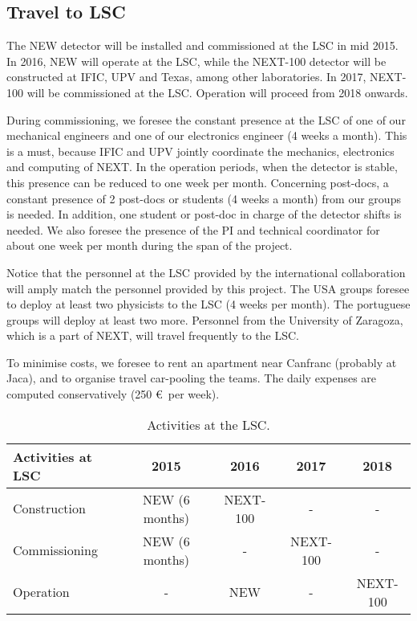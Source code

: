 \subsection{Travel to LSC}
The NEW detector will be installed and commissioned at the LSC in mid 2015. In 2016, NEW will operate at the LSC, while the NEXT-100 detector will be constructed at IFIC, UPV and Texas, among other laboratories. In 2017, NEXT-100 will be commissioned at the LSC. Operation will proceed from 2018 onwards.

During commissioning, we foresee the constant presence at the LSC of one of our mechanical engineers and one of our electronics engineer (4 weeks a month).  This is a must, because IFIC and UPV jointly coordinate the mechanics, electronics and computing of NEXT. In the operation periods, when the detector is stable, this presence can be reduced to one week per month. Concerning post-docs, a constant presence of 2 post-docs or students (4 weeks a month) from our groups is needed. In addition, one student or post-doc in charge of the detector shifts is needed. We also foresee the presence of the PI and technical coordinator for about one week per month during the span of the project. 

Notice that the personnel at the LSC provided by the international collaboration will amply match the personnel provided by this project. The USA groups foresee to deploy at least two physicists to the LSC (4 weeks per month). The portuguese groups will deploy at least two more. Personnel from the University of Zaragoza, which is a part of NEXT, will travel frequently to the LSC. 

To minimise costs, we foresee to rent an apartment near Canfranc (probably at Jaca), and to organise travel car-pooling the teams. The daily expenses are computed conservatively (250 \euro\ per week). 

\begin{table}[h!]
\begin{center}
\begin{tabular}{|l|c|c|c|c|}
\hline
Activities at LSC &	2015 &	2016 &	2017 &	2018\\
 \hline	
Construction &	NEW (6 months) &	NEXT-100 & - & - \\ 		
Commissioning	&NEW (6 months) &	- & NEXT-100 & - \\	
Operation	&	- &  NEW & - & NEXT-100 \\ 	
\hline\hline	
\end{tabular}  
\caption{Activities at the LSC.}
\label{tab.ActivitiesLSC}
\end{center}
\end{table}
 
